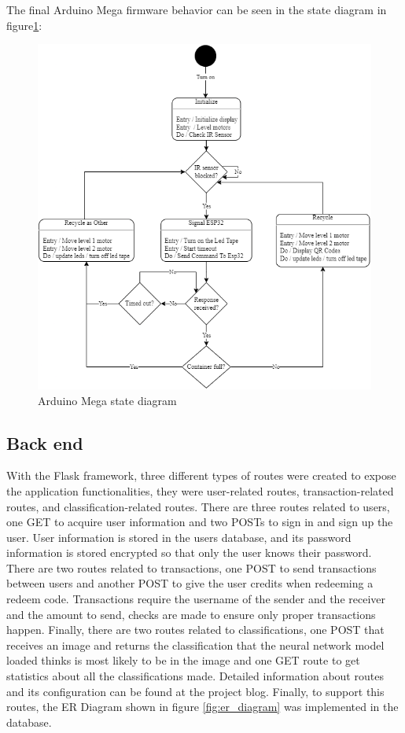 \documentclass[a4paper,11pt]{article}
\begin{document}
The final Arduino Mega firmware behavior can be seen in the state diagram in figure\ref{fig:arduinoState}:

\begin{figure}[H]
  \centering
  \includegraphics[width=12cm]{Figures/State chart Arduino Mega.png}
  \caption{\small{Arduino Mega state diagram}}
  \label{fig:arduinoState}
\end{figure}

\subsection{Back end}
With the Flask framework, three different types of routes were created to expose the application functionalities, they were user-related routes, transaction-related routes, and classification-related routes.
There are three routes related to users, one GET to acquire user information and two POSTs to sign in and sign up the user. User information is stored in the users database, and its password information is stored encrypted so that only the user knows their password.
There are two routes related to transactions, one POST to send transactions between users and another POST to give the user credits when redeeming a redeem code. Transactions require the username of the sender and the receiver and the amount to send, checks are made to ensure only proper transactions happen.
Finally, there are two routes related to classifications, one POST that receives an image and returns the classification that the neural network model loaded thinks is most likely to be in the image and one GET route to get statistics about all the classifications made. Detailed information about routes and its configuration can be found at the project blog\cite{blog}.
Finally, to support this routes, the ER Diagram shown in figure \ref{fig:er_diagram} was implemented in the database.
\end{document}
